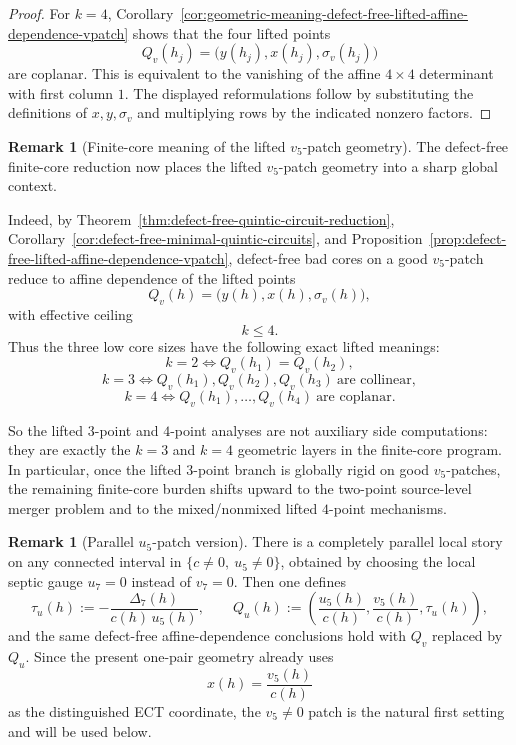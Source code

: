 \documentclass[11pt,a4paper]{amsart}
\theoremstyle{plain}
\theoremstyle{definition}
\newtheorem{remark}[theorem]{Remark}
\begin{document}
\begin{proof}
For $k=4$, Corollary~\ref{cor:geometric-meaning-defect-free-lifted-affine-dependence-vpatch}
shows that the four lifted points
\[
Q_v(h_j)=\bigl(y(h_j),x(h_j),\sigma_v(h_j)\bigr)
\]
are coplanar. This is equivalent to the vanishing of the affine $4\times4$
determinant with first column $1$. The displayed reformulations follow by
substituting the definitions of $x,y,\sigma_v$ and multiplying rows by the
indicated nonzero factors.
\end{proof}

\begin{remark}[Finite-core meaning of the lifted $v_5$-patch geometry]
\label{rem:finite-core-meaning-lifted-vpatch-geometry}
The defect-free finite-core reduction now places the lifted $v_5$-patch
geometry into a sharp global context.

Indeed, by
Theorem~\ref{thm:defect-free-quintic-circuit-reduction},
Corollary~\ref{cor:defect-free-minimal-quintic-circuits}, and
Proposition~\ref{prop:defect-free-lifted-affine-dependence-vpatch},
defect-free bad cores on a good $v_5$-patch reduce to affine dependence of the
lifted points
\[
Q_v(h)=\bigl(y(h),x(h),\sigma_v(h)\bigr),
\]
with effective ceiling
\[
k\le 4.
\]
Thus the three low core sizes have the following exact lifted meanings:
\[
k=2 \Longleftrightarrow Q_v(h_1)=Q_v(h_2),
\]
\[
k=3 \Longleftrightarrow Q_v(h_1),Q_v(h_2),Q_v(h_3)
\ \text{are collinear},
\]
\[
k=4 \Longleftrightarrow Q_v(h_1),\dots,Q_v(h_4)
\ \text{are coplanar}.
\]

So the lifted $3$-point and $4$-point analyses are not auxiliary side
computations: they are exactly the $k=3$ and $k=4$ geometric layers in the
finite-core program. In particular, once the lifted $3$-point branch is
globally rigid on good $v_5$-patches, the remaining finite-core burden shifts
upward to the two-point source-level merger problem and to the mixed/nonmixed
lifted $4$-point mechanisms.
\end{remark}

\begin{remark}[Parallel $u_5$-patch version]
\label{rem:parallel-u5-patch-version}
There is a completely parallel local story on any connected interval in
$\{c\neq 0,\ u_5\neq 0\}$, obtained by choosing the local septic gauge
$u_7=0$ instead of $v_7=0$. Then one defines
\[
\tau_u(h):=-\frac{\Delta_7(h)}{c(h)\,u_5(h)},
\qquad
Q_u(h):=\left(\frac{u_5(h)}{c(h)},\frac{v_5(h)}{c(h)},\tau_u(h)\right),
\]
and the same defect-free affine-dependence conclusions hold with $Q_v$
replaced by $Q_u$. Since the present one-pair geometry already uses
\[
x(h)=\frac{v_5(h)}{c(h)}
\]
as the distinguished ECT coordinate, the $v_5\neq 0$ patch is the natural
first setting and will be used below.
\end{remark}
\end{document}
